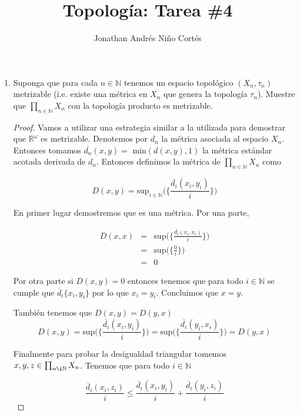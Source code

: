 \documentclass[letter,twoside,12pt]{article}
\title{Topología: Tarea \#4}
\author{Jonathan Andrés Niño Cortés}
\begin{document}
\maketitle
\begin{enumerate}
\item Suponga que para cada $ n \in \mathbb{N} $ tenemos un espacio topológico $ (X_n,\tau_n) $ metrizable (i.e. existe una métrica en $ X_n $ que genera la topología $ \tau_n $). Muestre que $ \prod_{n \in \mathbb{N}} X_n$ con la topología producto es metrizable.
\begin{proof}
Vamos a utilizar una estrategia similar a la utilizada para demostrar que $ \mathbb{R}^{\omega} $ es metrizable. Denotemos por $ d_n $ la métrica asociada al espacio $ X_n $. Entonces tomamos $ \overline{d_n}(x,y) = \text{ min}(d(x,y),1)$ la métrica estándar acotada derivada de $ d_n $. Entonces definimos la métrica de $ \prod_{n \in \mathbb{N}} X_n$ como 

\begin{equation}
D(x,y)=\text{sup}_{i \in \mathbb{N}}\Big(\Big\{\frac{\overline{d_i}(x_i,y_i)}{i}\Big\}\Big) \nonumber
\end{equation}

En primer lugar demostremos que es una métrica. Por una parte,

\begin{eqnarray}
D(x,x)&=&\text{sup}\Big(\Big\{\frac{\overline{d_i}(x_i,x_i)}{i}\Big\}\Big) \nonumber
\\&=&\text{sup}\Big(\Big\{\frac{0}{i}\Big\}\Big) \nonumber
\\&=&0 \nonumber
\end{eqnarray}

Por otra parte si $ D(x,y) = 0$ entonces tenemos que para todo $ i \in \mathbb{N} $ se cumple que $ \overline{d}_i\{x_i,y_i\} $ por lo que $ x_i = y_i $. Concluimos que $ x = y $.

También tenemos que $ D(x,y) = D(y,x)$
\begin{equation}
D(x,y)=\text{sup}\Big(\Big\{\frac{\overline{d_i}(x_i,y_i)}{i}\Big\}\Big) = \text{sup}\Big(\Big\{\frac{\overline{d_i}(y_i,x_i)}{i}\Big\}\Big) = D(y,x)\nonumber
\end{equation}

Finalmente para probar la desigualdad triangular tomemos $x,y,z \in \prod_{n \i \mathbb{N}}X_n$. Tenemos que para todo $ i \in \mathbb{N} $

\begin{equation}
\frac{\overline{d}_i(x_i,z_i)}{i}\leq \frac{\overline{d}_i(x_i,y_i)}{i}+\frac{\overline{d}_i(y_i,z_i)}{i}  \nonumber
\end{equation}


\end{proof}
\end{enumerate}
\end{document}
